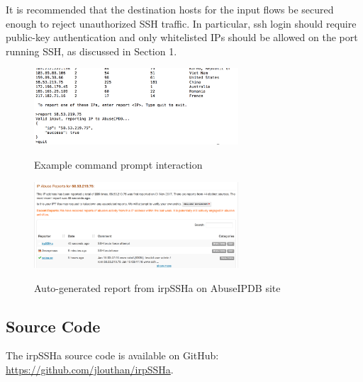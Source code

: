It is recommended that the destination hosts for the input flows be secured enough to reject
unauthorized SSH traffic. In particular, ssh login should require public-key authentication and only whitelisted IPs should be allowed on the port running SSH, as discussed in Section 1.

\begin{figure}[H]
{\includegraphics[width=3in]{./figures/561-irpSSHa-prompt.png}}
\caption{\small{Example command prompt interaction}}
\label{fig:prompt}
\end{figure}

\begin{figure}[H]
{\includegraphics[width=3in]{./figures/561-AbuseIPDB-report.png}}
\caption{\small{Auto-generated report from irpSSHa on AbuseIPDB site}}
\label{fig:report}
\end{figure}

\subsection{Source Code}

The irpSSHa source code is available on GitHub:  \href{https://github.com/jlouthan/irpSSHa}{https://github.com/jlouthan/irpSSHa}.
\label{sec:design}




